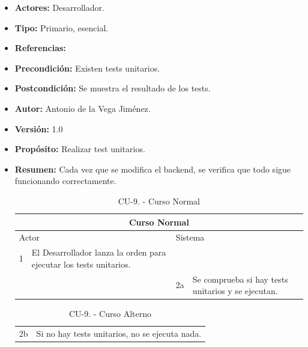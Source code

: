   \begin{itemize}
    \item \textbf{Actores:} Desarrollador.
    \item \textbf{Tipo:} Primario, esencial.
    \item \textbf{Referencias:}
    \item \textbf{Precondición:} Existen tests unitarios.
    \item \textbf{Postcondición:} Se muestra el resultado de los tests.
    \item \textbf{Autor:} Antonio de la Vega Jiménez.
    \item \textbf{Versión:} 1.0
    \item \textbf{Propósito:} Realizar test unitarios.
    \item \textbf{Resumen:} Cada vez que se modifica el backend, se verifica que todo sigue funcionando correctamente.
    \begin{table}[H]
      \centering
      \begin{tabularx}{\textwidth}{|l|X|l|X|}
        \hline
        \multicolumn{4}{|c|}{\cellcolor[HTML]{C0C0C0}Curso Normal}                                                 \\ \hline
        \multicolumn{2}{|l|}{\cellcolor[HTML]{EFEFEF}Actor} & \multicolumn{2}{l|}{\cellcolor[HTML]{EFEFEF}Sistema} \\ \hline
        1                         & El Desarrollador lanza la orden para ejecutar los tests unitarios.                        &                            &                         \\ \hline
                                  &                         & 2a                          & Se comprueba si hay tests unitarios y se ejecutan.                       \\ \hline

                                  
      \end{tabularx}
      \caption{CU-9. - Curso Normal}
      \label{my-label}
    \end{table}
    \begin{table}[H]
      \centering
      \begin{tabularx}{\textwidth}{|l|X|}
       \hline
       \rowcolor[HTML]{C0C0C0} 
       \multicolumn{2}{|l|}{\cellcolor[HTML]{C0C0C0}Curso Alterno} \\ \hline
       \rowcolor[HTML]{FFFFFF} 
              2b                      & Si no hay tests unitarios, no se ejecuta nada.                            \\ \hline
      \end{tabularx}
      \caption{CU-9. - Curso Alterno}
      \label{my-label}
    \end{table}
  \end{itemize}
